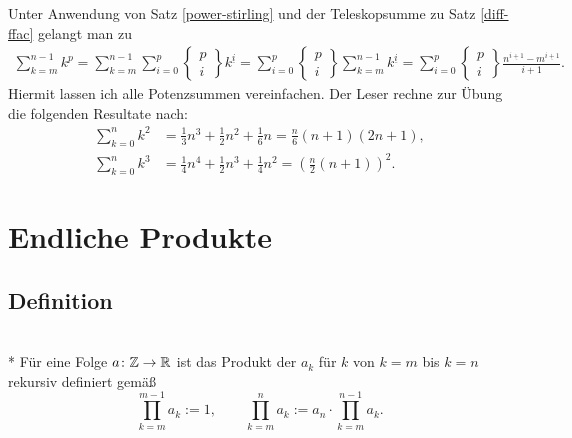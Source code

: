Unter Anwendung von Satz \ref{power-stirling}
und der Teleskopsumme zu Satz \ref{diff-ffac} gelangt man zu
\begin{gather*}
\sum_{k=m}^{n-1} k^p = \sum_{k=m}^{n-1} \sum_{i=0}^p
\begin{Bmatrix}p\\ i\end{Bmatrix}k^{\underline i}
= \sum_{i=0}^p \begin{Bmatrix}p\\ i\end{Bmatrix}\sum_{k=m}^{n-1}
k^{\underline i}
= \sum_{i=0}^p \begin{Bmatrix}p\\ i\end{Bmatrix}
\frac{n^{\underline{i+1}}-m^{\underline{i+1}}}{i+1}.
\end{gather*}
Hiermit lassen ich alle Potenzsummen vereinfachen. Der Leser
rechne zur Übung die folgenden Resultate nach:
\begin{align}
\sum_{k=0}^n k^2 &= \tfrac{1}{3}n^3+\tfrac{1}{2}n^2+\tfrac{1}{6}n
= \tfrac{n}{6}(n+1)(2n+1),\\
\sum_{k=0}^n k^3 &= \tfrac{1}{4}n^4+\tfrac{1}{2}n^3+\tfrac{1}{4}n^2
= (\tfrac{n}{2}(n+1))^2.
\end{align}


\newpage
\section{Endliche Produkte}

\subsection{Definition}
\begin{Definition}[Produkt]\mbox{}\\*
Für eine Folge $a\colon\mathbb Z\to\mathbb R$ ist das Produkt der $a_k$ für
$k$ von $k=m$ bis $k=n$ rekursiv definiert gemäß%
\[\prod_{k=m}^{m-1} a_k := 1,\qquad
\prod_{k=m}^n a_k := a_n\cdot\prod_{k=m}^{n-1} a_k.\]
\end{Definition}

